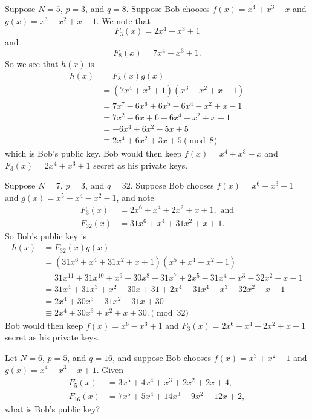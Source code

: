 \begin{example}
    Suppose $N = 5$, $p = 3$, and $q = 8$. Suppose Bob chooses $f(x) = x^4 + x^3 - x$ and $g(x) = x^3 - x^2 + x - 1$. We note that
    \[
        F_3(x) = 2x^4 + x^3 + 1
    \]
    and
    \[
        F_8(x) = 7x^4 + x^3 + 1.
    \]
    So we see that $h(x)$ is
    \begin{align*}
        h(x) &= F_8(x)g(x)\\
        &= (7x^4 + x^3 + 1)(x^3 - x^2 + x - 1)\\
        &= 7x^7 - 6x^6 + 6x^5 - 6x^4 - x^2 + x - 1\\
        &= 7x^2 - 6x + 6 - 6x^4 - x^2 + x - 1\\
        &= -6x^4 + 6x^2 - 5x + 5\\
        &\equiv 2x^4 + 6x^2 + 3x + 5 \pmod8
    \end{align*}
    which is Bob's public key. Bob would then keep $f(x) = x^4 + x^3 - x$ and $F_3(x) = 2x^4 + x^3 + 1$ secret as his private keys.
\end{example}
\begin{example}
    Suppose $N = 7$, $p = 3$, and $q = 32$. Suppose Bob chooses $f(x) = x^6 - x^3 + 1$ and $g(x) = x^5 + x^4 - x^2 - 1$, and note
    \begin{align*}
        F_3(x) &= 2x^6 + x^4 + 2x^2 + x + 1, \text{ and}\\
        F_{32}(x) &= 31x^6 + x^4 + 31x^2 + x + 1.
    \end{align*}
    So Bob's public key is
    \begin{align*}
        h(x) &= F_{32}(x)g(x)\\
        &= (31x^6 + x^4 + 31x^2 + x + 1)(x^5 + x^4 - x^2 - 1)\\
        &= 31x^{11} + 31x^{10} + x^9 - 30x^8 + 31x^7 + 2x^5 - 31x^4 - x^3 - 32x^2 - x - 1\\
        &= 31x^4 + 31x^3 + x^2 - 30x + 31 + 2x^4 - 31x^4 - x^3 - 32x^2 - x - 1\\
        &= 2x^4 + 30x^3 - 31x^2 - 31x + 30\\
        &\equiv 2x^4 + 30x^3 + x^2 + x + 30. \pmod{32}
    \end{align*}
    Bob would then keep $f(x) = x^6 - x^3 + 1$ and $F_3(x) = 2x^6 + x^4 + 2x^2 + x + 1$ secret as his private keys.
\end{example}

\begin{exercise}
    Let $N = 6$, $p = 5$, and $q = 16$, and suppose Bob chooses $f(x) = x^3 + x^2 - 1$ and $g(x) = x^4 - x^3 - x + 1$. Given
    \begin{align*}
        F_5(x) &= 3x^5 + 4x^4 + x^3 + 2x^2 + 2x + 4,\\
        F_{16}(x) &= 7x^5 + 5x^4 + 14x^3 + 9x^2 + 12x + 2,
    \end{align*}
    what is Bob's public key?
\end{exercise}

